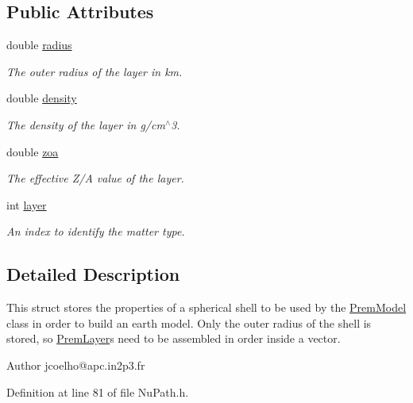 \subsection*{Public Attributes}
\begin{DoxyCompactItemize}
\item 
double \hyperlink{structOscProb_1_1PremLayer_a39b409c20fd96a7a0bd421567c00ffed}{radius}
\begin{DoxyCompactList}\small\item\em The outer radius of the layer in km. \end{DoxyCompactList}\item 
double \hyperlink{structOscProb_1_1PremLayer_aba2536cbdab87d0db33df47f95c4f2c3}{density}
\begin{DoxyCompactList}\small\item\em The density of the layer in g/cm$^\wedge$3. \end{DoxyCompactList}\item 
double \hyperlink{structOscProb_1_1PremLayer_a8687a8169d786fca79908292d11077f5}{zoa}
\begin{DoxyCompactList}\small\item\em The effective Z/A value of the layer. \end{DoxyCompactList}\item 
int \hyperlink{structOscProb_1_1PremLayer_aca8d7df68e6f982155b68b7e6a7ef389}{layer}
\begin{DoxyCompactList}\small\item\em An index to identify the matter type. \end{DoxyCompactList}\end{DoxyCompactItemize}


\subsection{Detailed Description}
This struct stores the properties of a spherical shell to be used by the \hyperlink{classOscProb_1_1PremModel}{Prem\+Model} class in order to build an earth model. Only the outer radius of the shell is stored, so \hyperlink{structOscProb_1_1PremLayer}{Prem\+Layer}\textquotesingle{}s need to be assembled in order inside a vector.

\begin{DoxyAuthor}{Author}
jcoelho@apc.\+in2p3.\+fr 
\end{DoxyAuthor}


Definition at line 81 of file Nu\+Path.\+h.



